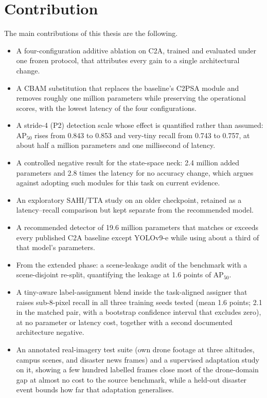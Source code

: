 \section{Contribution}
The main contributions of this thesis are the following.
\begin{itemize}
  \item A four-configuration additive ablation on C2A, trained and evaluated
        under one frozen protocol, that attributes every gain to a single
        architectural change.
  \item A CBAM substitution that replaces the baseline's C2PSA module and
        removes roughly one million parameters while preserving the
        operational scores, with the lowest latency of the four configurations.
  \item A stride-4 (P2) detection scale whose effect is quantified rather
        than assumed: $\mathrm{AP}_{50}$ rises from 0.843 to 0.853 and
        very-tiny recall from 0.743 to 0.757, at about half a million
        parameters and one millisecond of latency.
  \item A controlled negative result for the state-space neck: 2.4 million
        added parameters and 2.8 times the latency for no accuracy change,
        which argues against adopting such modules for this task on current
        evidence.
  \item An exploratory SAHI/TTA study on an older checkpoint, retained as a
        latency--recall comparison but kept separate from the recommended model.
  \item A recommended detector of 19.6 million parameters that matches or
        exceeds every published C2A baseline except YOLOv9-e while using
        about a third of that model's parameters.
  \item From the extended phase: a scene-leakage audit of the benchmark with
        a scene-disjoint re-split, quantifying the leakage at 1.6 points of
        $\mathrm{AP}_{50}$.
  \item A tiny-aware label-assignment blend inside the task-aligned assigner
        that raises sub-8-pixel recall in all three training seeds tested
        (mean 1.6 points; 2.1 in the matched pair, with a bootstrap
        confidence interval that excludes zero), at no parameter or latency
        cost, together with a second documented architecture negative.
  \item An annotated real-imagery test suite (own drone footage at three
        altitudes, campus scenes, and disaster news frames) and a supervised
        adaptation study on it, showing a few hundred labelled frames close
        most of the drone-domain gap at almost no cost to the source
        benchmark, while a held-out disaster event bounds how far that
        adaptation generalises.
\end{itemize}

